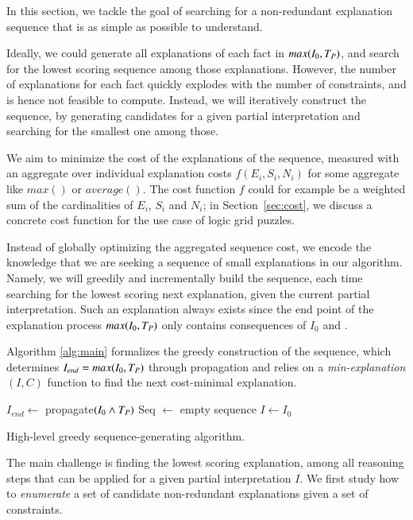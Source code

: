 In this section, we tackle the goal of searching for a non-redundant explanation sequence that is as simple as possible to understand.

Ideally, we could generate all explanations of each fact in $max(I_0,T_P)$, and search for the lowest scoring sequence among those explanations. However, the number of explanations for each fact quickly explodes with the number of constraints, and is hence not feasible to compute. Instead, we will iteratively construct the sequence, by generating candidates for a given partial interpretation and searching for the smallest one among those.

We aim to minimize the cost of the explanations of the sequence, measured with an aggregate over individual explanation costs $f(E_i, S_i, N_i)$ for some aggregate like $max()$ or $average()$. The cost function $f$ could for example be a weighted sum of the cardinalities of $E_i$, $S_i$ and $N_i$; in Section~\ref{sec:cost}, we discuss a concrete cost function for the use case of logic grid puzzles.

Instead of globally optimizing the aggregated sequence cost, we encode the knowledge that we are seeking a sequence of small explanations in our algorithm. Namely, we will greedily and incrementally build the sequence, each time searching for the lowest scoring next explanation, given the current partial interpretation. Such an explanation always exists since the end point of the explanation process $max(I_0,T_P)$ only contains consequences of $I_0$ and \allconstraints.

Algorithm \ref{alg:main} formalizes the greedy construction of the sequence, which determines $I_{end} = max(I_0,T_P)$  through propagation and relies on a \textit{min-explanation$(I,C)$} function to find the next cost-minimal explanation.

\begin{algorithm}
  $I_{end} \gets$ propagate$(I_0\land T_P)$\;
  Seq $\gets$ empty sequence\;
  $I \gets I_0$\;
  \caption{High-level greedy sequence-generating algorithm.}
  \label{alg:main}
\end{algorithm}
The main challenge is finding the lowest scoring explanation, among all reasoning steps that can be applied for a given partial interpretation $I$. We first study how to \textit{enumerate} a set of candidate non-redundant explanations given a set of constraints.

